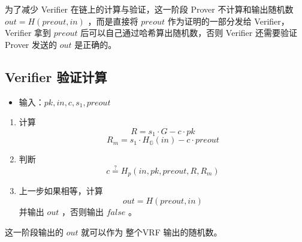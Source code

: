 \documentclass[10pt]{ctexart}
\begin{document}
为了减少 Verifier 在链上的计算与验证，这一阶段 Prover 不计算和输出随机数 $out = H(preout, in)$ ，而是直接将 $preout$ 作为证明的一部分发给 Verifier，Verifier 拿到 $preout$ 后可以自己通过哈希算出随机数，否则 Verifier 还需要验证 Prover 发送的 $out$ 是正确的。

\subsection{Verifier 验证计算}

\begin{itemize}
    \item 输入：$pk, in, c, s_1, preout$
\end{itemize}

\begin{enumerate}
    \item 计算 \[R = s_1 \cdot G - c \cdot pk\] \[R_m = s_1 \cdot  H_{\mathbb{G}}(in) - c \cdot preout\]
    \item 判断 \[c \overset{?}{=} H_p(in, pk, preout, R, R_m)\]
    \item 上一步如果相等，计算 \[out = H(preout, in)\]并输出 $out$ ，否则输出 $false$ 。
\end{enumerate}

这一阶段输出的 $out$ 就可以作为 整个VRF 输出的随机数。
\end{document}
